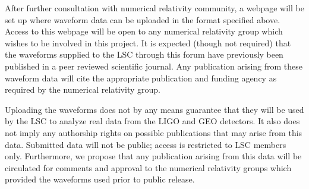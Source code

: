 \documentclass[10pt]{ligodcc}
\begin{document}
After further consultation with numerical relativity community, a
webpage will be set up where waveform data can be uploaded in the
format specified above.  Access to this webpage will be open to any
numerical relativity group which wishes to be involved in this
project.  It is expected (though not required) that the waveforms
supplied to the LSC through this forum have previously been published
in a peer reviewed scientific journal.  Any publication arising from
these waveform data will cite the appropriate publication and funding
agency as required by the numerical relativity group.

Uploading the waveforms does not by any means guarantee that they will
be used by the LSC to analyze real data from the LIGO and GEO
detectors.  It also does not imply any authorship rights on possible
publications that may arise from this data.  Submitted data will not
be public; access is restricted to LSC members only.  Furthermore, we
propose that any publication arising from this data will be circulated
for comments and approval to the numerical relativity groups which
provided the waveforms used prior to public release.
\end{document}
